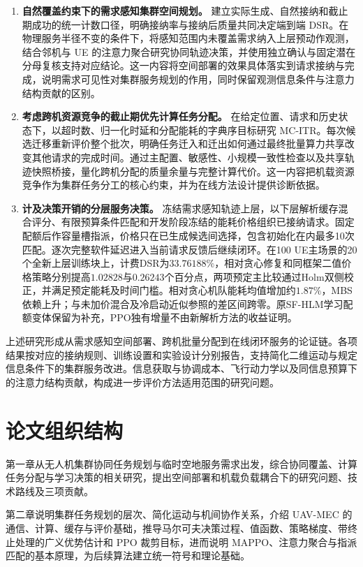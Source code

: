 \begin{enumerate}
    \item \textbf{自然覆盖约束下的需求感知集群空间规划。} 建立实际生成、自然接纳和截止期成功的统一计数口径，明确接纳率与接纳后质量共同决定端到端 DSR。在物理服务半径不变的条件下，将感知范围内未覆盖需求纳入上层预动作观测，结合邻机与 UE 的注意力聚合研究协同轨迹决策，并使用独立确认与固定潜在分母复核支持对应结论。这一内容将空间部署的效果具体落实到请求接纳与完成，说明需求可见性对集群服务规划的作用，同时保留观测信息条件与注意力结构贡献的区别。
    \item \textbf{考虑跨机资源竞争的截止期优先计算任务分配。} 在给定位置、请求和历史状态下，以超时数、归一化时延和分配能耗的字典序目标研究 MC-ITR。每次候选迁移重新评价整个批次，明确任务迁入和迁出如何通过最终批量算力共享改变其他请求的完成时间。通过主配置、敏感性、小规模一致性检查以及共享轨迹快照桥接，量化跨机分配的质量余量与完整计算代价。这一内容把机载资源竞争作为集群任务分工的核心约束，并为在线方法设计提供诊断依据。
    \item \textbf{计及决策开销的分层服务决策。} 冻结需求感知轨迹上层，以下层解析缓存混合评分、有限预算条件匹配和开发阶段冻结的能耗价格组织已接纳请求。固定配额后作容量槽指派，价格只在已生成候选间选择，包含初始化在内最多10次匹配。逐次完整软件延迟进入当前请求反馈后继续闭环。在100 UE主场景的20个全新上层训练块上，计费DSR为$33.76188\%$，相对贪心修复和同框架二值价格策略分别提高$1.02828$与$0.26243$个百分点，两项预定主比较通过Holm双侧校正，并满足预定能耗及时间门槛。相对贪心机队能耗均值增加约$1.87\%$，MBS依赖上升；与未加价混合及冷启动近似参照的差区间跨零。原SF-HLM学习配额变体保留为补充，PPO独有增量不由新解析方法的收益证明。
\end{enumerate}

上述研究形成从需求感知空间部署、跨机批量分配到在线闭环服务的论证链。各项结果按对应的接纳规则、训练设置和实验设计分别报告，支持简化二维运动与规定信息条件下的集群服务改进。信息获取与协调成本、飞行动力学以及同信息预算下的注意力结构贡献，构成进一步评价方法适用范围的研究问题。

\section{论文组织结构}
\label{sec:arrangement}

第一章从无人机集群协同任务规划与临时空地服务需求出发，综合协同覆盖、计算任务分配与学习决策的相关研究，提出空间部署和机载负载耦合下的研究问题、技术路线及三项贡献。

第二章说明集群任务规划的层次、简化运动与机间协作关系，介绍 UAV-MEC 的通信、计算、缓存与评价基础，推导马尔可夫决策过程、值函数、策略梯度、带终止处理的广义优势估计和 PPO 裁剪目标，进而说明 MAPPO、注意力聚合与指派匹配的基本原理，为后续算法建立统一符号和理论基础。

